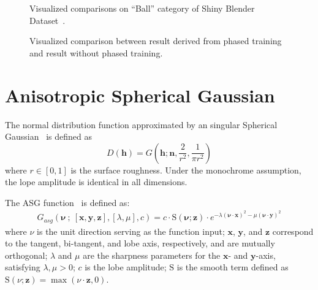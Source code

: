 \clearpage
\setcounter{page}{1}
\maketitlesupplementary
\appendix


\begin{figure*}
\vspace{-1ex}
    \centering
    \caption{Visualized comparisons on ``Ball'' category of Shiny Blender Dataset~\cite{verbin2022ref}.
    }
    \label{fig:ball}
\end{figure*}


\begin{figure*}
\vspace{-1ex}
    \centering
    \caption{Visualized comparison between result derived from phased training and result without phased training.}
    \label{fig:ablate}
\end{figure*}




\section{Anisotropic Spherical Gaussian}
The normal distribution function approximated by an singular Spherical Gaussian~\cite{wang2009all} is defined as
\begin{equation}
    D(\boldsymbol{h}) = G(\boldsymbol{h}; \boldsymbol{n}, \frac{2}{r^2}, \frac{1}{\pi r^2})
\end{equation}
where $r\in[0, 1]$ is the surface roughness. Under the monochrome assumption, the lope amplitude is identical in all dimensions. 

The ASG function~\cite{xu2013anisotropic} is defined as:
\begin{equation}
\begin{aligned}
    G_{asg}(\mathbf{\nu} \: ; \: [\mathbf{x}, \mathbf{y}, \mathbf{z}],[\lambda, \mu], c)= c \cdot \mathrm{S}(\mathbf{\nu} ; \mathbf{z}) \cdot e^{-\lambda(\mathbf{\nu} \cdot \mathbf{x})^{2}-\mu(\mathbf{\nu} \cdot \mathbf{y})^{2}}
\end{aligned}
\end{equation}
where $\nu$ is the unit direction serving as the function input; $\mathbf{x}$, $\mathbf{y}$, and $\mathbf{z}$ correspond to the tangent, bi-tangent, and lobe axis, respectively, and are mutually orthogonal; $\lambda$ and $\mu$ are the sharpness parameters for the $\mathbf{x}$- and $\mathbf{y}$-axis, satisfying $\lambda, \mu>0$; $c$ is the lobe amplitude; $\mathrm{S}$ is the smooth term defined as $\mathrm{S}(\nu ; \mathbf{z}) = \max (\nu \cdot \mathbf{z}, 0)$. 

